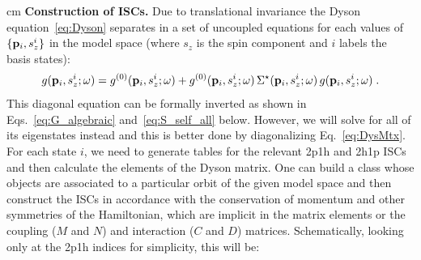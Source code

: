 cm
{\bf Construction of ISCs.}
Due to translational invariance the Dyson equation~\eqref{eq:Dyson} separates in a set of uncoupled equations
for each  values of $\{{\bf p}_i, s_{z}^i \}$ in the model space (where $s_{z}$ is the spin component and $i$ labels
the basis states):
\begin{align}
   g({\bf p}_i, s^i_z; \omega) = g^{(0)}({\bf p}_i, s^i_z; \omega) + g^{(0)}({\bf p}_i, s^i_z; \omega) \, \Sigma^\star({\bf p}_i, s^i_z; \omega) \,  g({\bf p}_i, s^i_z; \omega) \; .
\end{align}
This diagonal equation can be formally inverted as shown in Eqs.~\eqref{eq:G_algebraic}  and~\eqref{eq:S_self_all} below. However, we will solve for all of its eigenstates instead and this is better done by diagonalizing Eq.~\eqref{eq:DysMtx}.  For each state $i$, we need to generate
tables for the relevant 2p1h and 2h1p ISCs and then calculate the elements of  the Dyson matrix. 
One can build a class whose objects are associated to  a particular orbit of the given model space  and then construct the ISCs  
in accordance with the conservation  of momentum and other symmetries of the Hamiltonian, which are implicit in the matrix elements or the coupling ($M$ and $N$) and interaction ($C$ and $D$) matrices.
Schematically, looking only at the 2p1h indices for simplicity, this will be:
%
\lstset{language=c++}

